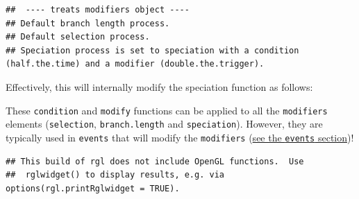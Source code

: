 \documentclass[
]{book}
\newenvironment{Shaded}{\begin{snugshade}}{\end{snugshade}}
\newcommand{\CommentTok}[1]{\textcolor[rgb]{0.56,0.35,0.01}{\textit{#1}}}
\newcommand{\ControlFlowTok}[1]{\textcolor[rgb]{0.13,0.29,0.53}{\textbf{#1}}}
\newcommand{\DecValTok}[1]{\textcolor[rgb]{0.00,0.00,0.81}{#1}}
\newcommand{\KeywordTok}[1]{\textcolor[rgb]{0.13,0.29,0.53}{\textbf{#1}}}
\newcommand{\NormalTok}[1]{#1}
\newcommand{\OperatorTok}[1]{\textcolor[rgb]{0.81,0.36,0.00}{\textbf{#1}}}
\newcommand{\StringTok}[1]{\textcolor[rgb]{0.31,0.60,0.02}{#1}}
\begin{document}
\begin{verbatim}
##  ---- treats modifiers object ---- 
## Default branch length process.
## Default selection process.
## Speciation process is set to speciation with a condition (half.the.time) and a modifier (double.the.trigger).
\end{verbatim}

Effectively, this will internally modify the speciation function as follows:

\begin{Shaded}
\end{Shaded}

These \texttt{condition} and \texttt{modify} functions can be applied to all the \texttt{modifiers} elements (\texttt{selection}, \texttt{branch.length} and \texttt{speciation}).
However, they are typically used in \texttt{events} that will modify the \texttt{modifiers} (\protect\hyperlink{makeevents}{see the \texttt{events} section})!

\begin{verbatim}
## This build of rgl does not include OpenGL functions.  Use
##  rglwidget() to display results, e.g. via options(rgl.printRglwidget = TRUE).
\end{verbatim}
\end{document}

